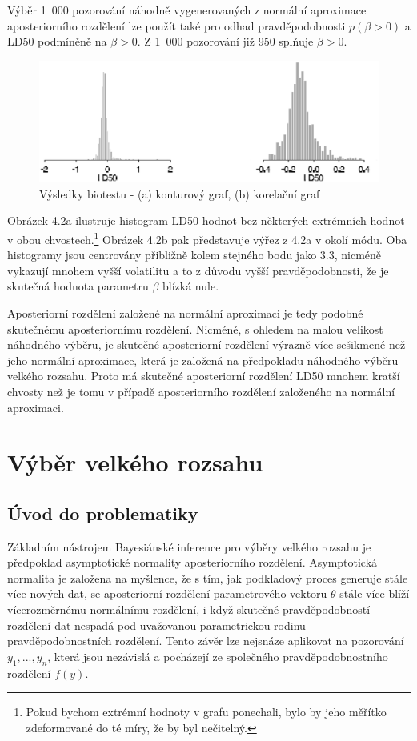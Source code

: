 Výběr 1~000 pozorování náhodně vygenerovaných z normální aproximace aposteriorního rozdělení lze použít také pro odhad pravděpodobnosti $p(\beta > 0)$ a LD50 podmíněně na $\beta > 0$. Z 1~000 pozorování již 950 splňuje $\beta > 0$.
\begin{figure}[htp]
\centering
\includegraphics[scale = 0.45]{pictures/fig_4_2.eps}
\caption{Výsledky biotestu - (a) konturový graf, (b) korelační graf}
\label{fig_4_2}
\end{figure}
Obrázek 4.2a ilustruje histogram LD50 hodnot bez některých extrémních hodnot v obou chvostech.\footnote{Pokud bychom extrémní hodnoty v grafu ponechali, bylo by jeho měřítko zdeformované do té míry, že by byl nečitelný.} Obrázek 4.2b pak představuje výřez z 4.2a v okolí módu. Oba histogramy jsou centrovány přibližně kolem stejného bodu jako 3.3, nicméně vykazují mnohem vyšší volatilitu a to z důvodu vyšší pravděpodobnosti, že je skutečná hodnota parametru $\beta$ blízká nule.

Aposteriorní rozdělení založené na normální aproximaci je tedy podobné skutečnému aposteriornímu rozdělení. Nicméně, s ohledem na malou velikost náhodného výběru, je skutečné aposteriorní rozdělení výrazně více sešikmené než jeho normální aproximace, která je založená na předpokladu náhodného výběru velkého rozsahu. Proto má skutečné aposteriorní rozdělení LD50 mnohem kratší chvosty než je tomu v případě aposteriorního rozdělení založeného na normální aproximaci.

\section{Výběr velkého rozsahu}

\subsection{Úvod do problematiky}

Základním nástrojem Bayesiánské inference pro výběry velkého rozsahu je předpoklad asymptotické normality aposteriorního rozdělení. Asymptotická normalita je založena na myšlence, že s tím, jak podkladový proces generuje stále více nových dat, se aposteriorní rozdělení parametrového vektoru $\theta$ stále více blíží vícerozměrnému normálnímu rozdělení, i když skutečné pravděpodobností rozdělení dat nespadá pod uvažovanou parametrickou rodinu pravděpodobnostních rozdělení. Tento závěr lze nejsnáze aplikovat na pozorování $y_1, ..., y_n$, která jsou nezávislá a pocházejí ze společného pravděpodobnostního rozdělení $f(y)$.

